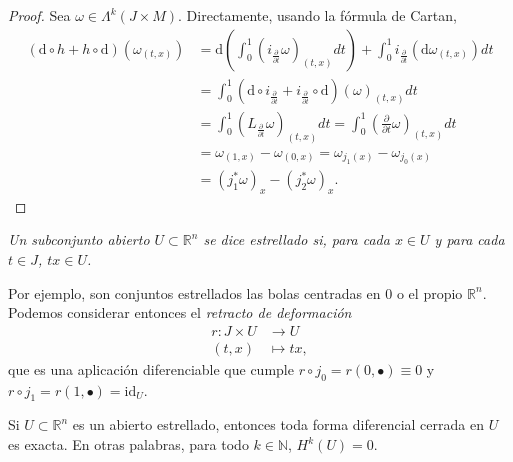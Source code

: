     \begin{proof}
      Sea $\omega \in \varLambda^k(J\times M)$.
      Directamente, usando la fórmula de Cartan,
      \begin{align*}
	(\mathrm{d}\circ h + h\circ\mathrm{d})(\omega_{(t,x)})&= \mathrm{d}\left( \int_0^1 (i_{\frac{\partial}{\partial t}}\omega)_{(t,x)}dt \right)+ \int_0^1 i_{\frac{\partial}{\partial t}}(\mathrm{d}\omega_{(t,x)})dt\\
&	= \int_0^1 (\mathrm{d}\circ i_{\frac{\partial}{\partial t}} + i_{\frac{\partial}{\partial t}}\circ \mathrm{d})(\omega)_{(t,x)}dt\\
	&= \int_0^1 (L_{\frac{\partial}{\partial t}}\omega)_{(t,x)}dt
	= \int_0^1 \left(\frac{\partial}{\partial t} \omega\right)_{(t,x)}dt\\
	&	= \omega_{(1,x)}-\omega_{(0,x)}=\omega_{ j_1 (x)} - \omega_{ j_0(x)} \\ & = (j_1^* \omega)_x - (j_2^* \omega)_x.
      \end{align*}
    \end{proof}

    \begin{defn}
      \em
      Un subconjunto abierto $U\subset \mathbb{R}^n$ se dice \emph{estrellado} si, para cada $x\in U$ y para cada $t \in J$, $tx \in U$.
    \end{defn}
    Por ejemplo, son conjuntos estrellados las bolas centradas en $0$ o el propio $\mathbb{R} ^n$.
    Podemos considerar entonces el \emph{retracto de deformación}
    \begin{align*}
      r :J\times U&\longrightarrow U\\ 
        (t,x) &\longmapsto tx, 
      \end{align*}
      que es una aplicación diferenciable que cumple $r\circ j_0=r(0,\bullet)\equiv 0$ y $r\circ j_1 = r(1,\bullet)= \mathrm{id}_U$.

      \begin{prop}
	Si $U\subset \mathbb{R}^n$ es un abierto estrellado, entonces toda forma diferencial cerrada en $U$ es exacta. En otras palabras, para todo $k\in \mathbb{N} $, $H^k(U)=0$.
      \end{prop}

